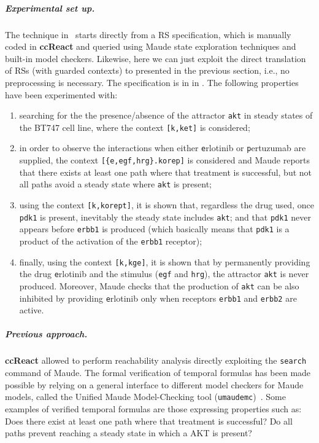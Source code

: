 \subparagraph*{Experimental set up.}
The technique in~\cite{DBLP:conf/cmsb/BallisBFO24} starts directly from a RS specification, which is manually coded in \textbf{ccReact} and queried using Maude state exploration techniques and built-in model checkers. Likewise, here we can just exploit the direct translation of RSs (with guarded contexts) to \GROOVE presented in the previous section, i.e., no preprocessing is necessary. The \BioResolve specification is in  in .
The following properties have been experimented with:
\begin{enumerate}
\item searching for the the presence/absence of the attractor \texttt{akt} in steady states of the BT747 cell line, where the context \verb=[k,ket]= is considered;

\item in order to observe the interactions when either \texttt{e}rlotinib or \texttt{p}ertuzumab are supplied, the context \verb=[{e,egf,hrg}.korep]= is considered and Maude reports that there exists at least one path where that treatment is successful, but not all paths avoid a steady state where \texttt{akt} is present;

\item using the context \verb=[k,korept]=, it is shown that, regardless the drug used, once \texttt{pdk1} is present, inevitably the steady state includes \texttt{akt}; and that \texttt{pdk1} never appears before \texttt{erbb1} is produced (which basically means that \texttt{pdk1} is a product of the activation of the \texttt{erbb1} receptor);

\item finally, using the context \verb=[k,kge]=, it is shown that by permanently providing the drug \texttt{e}rlotinib and the stimulus (\texttt{egf} and \texttt{hrg}), the attractor \texttt{akt} is never produced. Moreover, Maude checks that the production of \texttt{akt} can be also inhibited by providing \texttt{e}rlotinib only when receptors \texttt{erbb1} and \texttt{erbb2} are active.
\end{enumerate}

\subparagraph*{Previous approach.}
\textbf{ccReact} allowed to perform reachability analysis directly exploiting the \texttt{search} command of Maude. 
The formal verification of temporal formulas has been made possible by relying on a general interface to different model checkers for Maude models, called the Unified Maude Model-Checking tool (\texttt{umaudemc})~\cite{DBLP:journals/jlap/RubioMPV21}.
Some examples of verified temporal formulas are those expressing properties such as:
Does there exist at least one path where that treatment is successful?
Do all paths prevent reaching a steady state in which a AKT is present?

